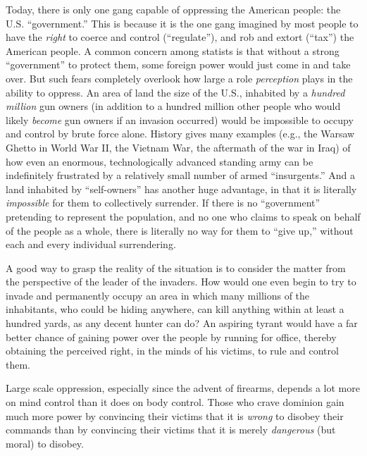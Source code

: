 \documentclass{book}
\begin{document}
Today, there is only one gang capable of oppressing the American people: the U.S. \enquote{government.} This is because it is the one gang imagined by most people to have the \emph{right} to coerce and control (\enquote{regulate}), and rob and extort (\enquote{tax}) the American people. A common concern among statists is that without a strong \enquote{government} to protect them, some foreign power would just come in and take over. But such fears completely overlook how large a role \emph{perception} plays in the ability to oppress. An area of land the size of the U.S., inhabited by a \emph{hundred million} gun owners (in addition to a hundred million other people who would likely \emph{become} gun owners if an invasion occurred) would be impossible to occupy and control by brute force alone. History gives many examples (e.g., the Warsaw Ghetto in World War II, the Vietnam War, the aftermath of the war in Iraq) of how even an enormous, technologically advanced standing army can be indefinitely frustrated by a relatively small number of armed \enquote{insurgents.} And a land inhabited by \enquote{self-owners} has another huge advantage, in that it is literally \emph{impossible} for them to collectively surrender. If there is no \enquote{government} pretending to represent the population, and no one who claims to speak on behalf of the people as a whole, there is literally no way for them to \enquote{give up,} without each and every individual surrendering.

A good way to grasp the reality of the situation is to consider the matter from the perspective of the leader of the invaders. How would one even begin to try to invade and permanently occupy an area in which many millions of the inhabitants, who could be hiding anywhere, can kill anything within at least a hundred yards, as any decent hunter can do? An aspiring tyrant would have a far better chance of gaining power over the people by running for office, thereby obtaining the perceived right, in the minds of his victims, to rule and control them.

Large scale oppression, especially since the advent of firearms, depends a lot more on mind control than it does on body control. Those who crave dominion gain much more power by convincing their victims that it is \emph{wrong} to disobey their commands than by convincing their victims that it is merely \emph{dangerous} (but moral) to disobey.
\end{document}
